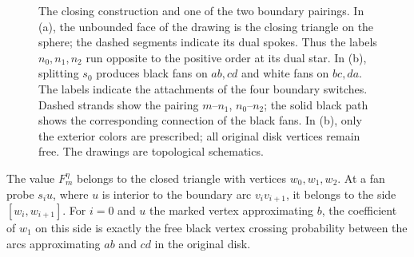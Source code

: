 \begin{figure}[htbp]
\caption{The closing construction and one of the two boundary pairings.
In (a), the unbounded face of the drawing is the closing triangle on the
sphere; the dashed segments indicate its dual spokes. Thus the labels
$n_0,n_1,n_2$ run opposite to the positive order at its dual star.
In (b), splitting $s_0$ produces black fans on $ab,cd$ and white fans on
$bc,da$. The labels indicate the attachments of the four boundary
switches. Dashed strands show the pairing $m$--$n_1$, $n_0$--$n_2$;
the solid black path shows the corresponding connection of the black
fans. In (b), only the exterior colors are prescribed; all original disk
vertices remain free. The drawings are topological schematics.}
\label{fig:closing-fans}
\end{figure}

\par\ifdim\dimexpr\pagegoal-\pagetotal\relax<6\baselineskip\newpage\fi
\begin{proposition}
\label{prop:observable}
The value $F_m^\eta$ belongs to the closed triangle with vertices
$w_0,w_1,w_2$. At a fan probe $s_i u$, where $u$ is interior to the boundary
arc $v_i v_{i+1}$, it belongs to the side $[w_i,w_{i+1}]$. For $i=0$ and
$u$ the marked vertex approximating $b$, the coefficient of $w_1$ on this
side is exactly the free black vertex crossing probability between the
arcs approximating $ab$ and $cd$ in the original disk.
\end{proposition}

